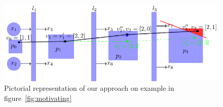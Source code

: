 \begin{figure}[t]
    \centering
    \includegraphics[scale=0.75]{fig/pictorial1.pdf}
    \caption{Pictorial representation of our approach on example in figure~\ref{fig:motivating}}
    \label{fig:pictorial1}
\end{figure}







        




